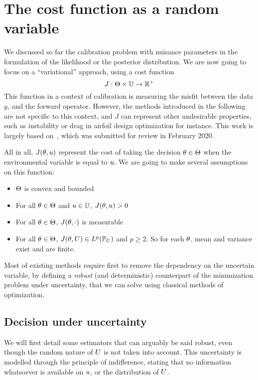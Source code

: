 \documentclass[../../Main_ManuscritThese.tex]{subfiles}
\begin{document}
\section{The cost function as a random variable}
\label{sec:J_rv}
We discussed so far the calibration problem with nuisance parameters in the formulation of the likelihood or the posterior distribution. We are now going to focus on a ``variational'' approach, using a cost function
\begin{equation}
  J: \Theta \times \mathbb{U} \rightarrow \mathbb{R}^+
\end{equation} 
This function in a context of calibration is measuring the misfit between the data $y$, and the forward operator. However, the methods introduced in the following are not specific to this context, and $J$ can represent other undesirable properties, such as instability or drag in airfoil design optimization for instance. This work is largely based on~\cite{trappler_robust_2020}, which was submitted for review in February 2020.


All in all, $J(\theta, u)$ represent the cost of taking the decision $\theta\in\Theta$ when the environmental variable is equal to $u$.
We are going to make several assumptions on this function:
\begin{itemize}
\item $\Theta$ is convex and bounded 
\item For all $\theta \in \Theta$ and $u \in \mathbb{U}$, $J(\theta, u)>0$
\item For all $\theta \in \Theta$, $J(\theta, \cdot)$ is measurable
\item For all $\theta \in \Theta$, $J(\theta, U) \in L^p(\mathbb{P}_{U})$ and $p \geq 2$. So for each $\theta$, mean and variance exist and are finite.
\end{itemize}

Most of existing methods require first to remove the dependency on the uncertain variable, by defining a \emph{robust} (and deterministic) counterpart of the minimization problem under uncertainty, that we can solve using classical methods of optimization.

\subsection{Decision under uncertainty}
We will first detail some estimators that can arguably be said robust, even though the random nature of $U$ is not taken into account. This uncertainty is modelled through the principle of indifference, stating that no information whatsoever is available on $u$, or the distribution of $U$.
\end{document}
